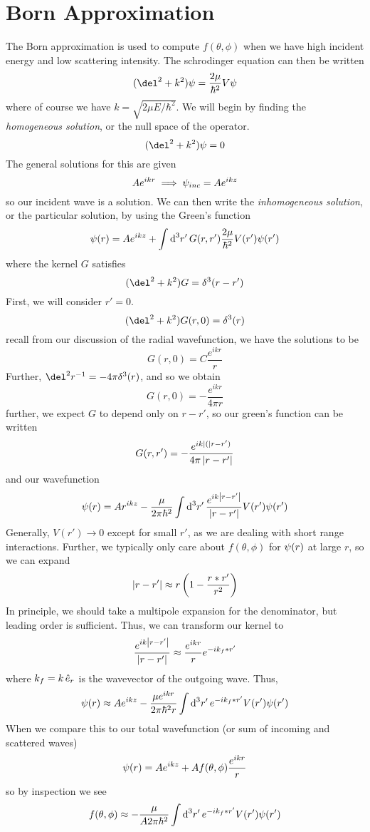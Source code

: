 \section{Born Approximation}
The Born approximation is used to compute \(f(\theta,\phi)\) when we have high incident energy and low scattering intensity. The schrodinger equation can then be written
\[(\del^2+k^2)\p = \frac{2\mu}{\hbar^2}V\p\]
where of course we have \(k = \sqrt{2\mu E/\hbar^2}\). We will begin by finding the \emph{homogeneous solution}, or the null space of the operator.
\[(\del^2+k^2)\p = 0\]
The general solutions for this are given
\[Ae^{ikr}\implies \psi_{inc} = Ae^{ikz}\]
so our incident wave is a solution. We can then write the \emph{inhomogeneous solution}, or the particular solution, by using the Green's function
\[\p(r) = Ae^{ikz} + \int\d[3]{r'}G(r,r') \frac{2\mu}{\hbar^2}V(r')\p(r')\]
where the kernel \(G\) satisfies
\[(\del^2+k^2)G = \delta^3(r-r')\]
First, we will consider \(r'=0\). 
\[(\del^2+k^2)G(r,0) = \delta^3(r)\]
recall from our discussion of the radial wavefunction, we have the solutions to be
\[G(r,0) = C\frac{e^{ikr}}{r}\]
Further, \(\del^2 r^{-1} =-4\pi \delta^3(r)\), and so we obtain
\[G(r,0) = -\frac{e^{ikr}}{4\pi r}\]
further, we expect \(G\) to depend only on \(r-r'\), so our green's function can be written
\begin{equation}
	G(r,r') = -\frac{e^{ik\left|(\right|r-r')}}{4\pi\left|r-r'\right|}
\end{equation}
and our wavefunction
\begin{equation}
	\p(r) = Ar^{ikz}-\frac{\mu}{2\pi\hbar^2}\int\d[3]{r'}\frac{e^{ik\abs{r-r'}}}{\abs{r-r'}}V(r')\p(r')
\end{equation}
Generally, \(V(r')\to0\) except for small \(r'\), as we are dealing with short range interactions. Further, we typically only care about \(f(\theta,\phi)\) for \(\psi(r)\) at large \(r\), so we can expand 
\[\left|r-r'\right| \approx r\left(1-\frac{r*r'}{r^2}\right)\]
In principle, we should take a multipole expansion for the denominator, but leading order is sufficient. Thus, we can transform our kernel to
\[\frac{e^{ik\left|r-r'\right|}}{\left|r-r'\right|}\approx \frac{e^{ikr}}{r}e^{-ik_f*r'}\]
where \(k_f = k\,\hat{e}_{r}\) is the wavevector of the outgoing wave. Thus,
\[\p(r)\approx Ae^{ikz}-\frac{\mu e^{ikr}}{2\pi \hbar^2 r}\int\d[3]{r'}e^{-ik_f*r'}V(r')\p(r')\]
When we compare this to our total wavefunction (or sum of incoming and scattered waves)
\[\psi(r) = Ae^{ikz}+Af(\theta,\phi)\frac{e^{ikr}}{r}\]
so by inspection we see
\[f(\theta,\phi)\approx -\frac{\mu}{A2\pi\hbar^2}\int\d[3]{r'}e^{-ik_f*r'}V(r')\p(r')\]
